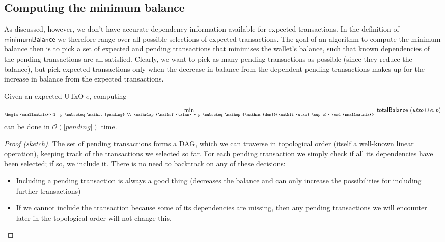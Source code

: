 \documentclass{article}
\newcommand{\order}[1]{\mathcal{O}\left(#1\right)}
\DeclareMathOperator{\dom}{dom}
\DeclareMathOperator*{\minimum}{min}
\theoremstyle{definition}{
  \newtheorem{lemma}{Lemma}[section] %
  \newtheorem{definition}[lemma]{Definition}
}
\theoremstyle{theorem}{
  \newtheorem{invariant}[lemma]{Invariant}
  \newtheorem{proofobligation}[lemma]{Proof Obligation}
}
\numberwithin{equation}{lemma}
\begin{document}
\subsection{Computing the minimum balance}

As discussed, however, we don't have accurate dependency information available
for expected transactions. In the definition of $\mathsf{minimumBalance}$ we
therefore range over all possible selections of expected transactions.
The goal of an algorithm to compute the minimum balance then is to pick a set
of expected and pending transactions that minimises the wallet's balance, such
that known dependencies of the pending transactions are all satisfied.
Clearly, we want to pick as many pending transactions as possible (since they
reduce the balance), but pick expected transactions only when the decrease in
balance from the dependent pending transactions makes up for the increase in
balance from the expected transactions.

\begin{lemma}
Given an expected UTxO $e$, computing
%
\begin{equation*}
  \minimum_{\begin{smallmatrix*}[l]
              p \subseteq \mathit{pending} \\
              \mathrlap{\mathsf{txins} ~ p \subseteq \dom(\mathit{utxo} \cup e)}
            \end{smallmatrix*}}
  ~ \mathsf{totalBalance} ~ (\mathit{utxo} \cup e, p)
\end{equation*}
%
can be done in $\order{|\mathit{pending}|}$ time.
\end{lemma}

\begin{proof}[Proof (sketch)]
The set of pending transactions forms a DAG, which we can traverse in
topological order (itself a well-known linear operation), keeping track of the
transactions we selected so far. For each pending transaction we simply check if
all its dependencies have been selected; if so, we include it. There is no need
to backtrack on any of these decisions:

\begin{itemize}
\item Including a pending transaction is always a good thing (decreases the
balance and can only increase the possibilities for  including further
transactions)
\item If we cannot include the transaction because some of its dependencies
are missing, then any pending transactions we will encounter later in the
topological order will not change this.
\end{itemize}
\end{proof}
\end{document}
